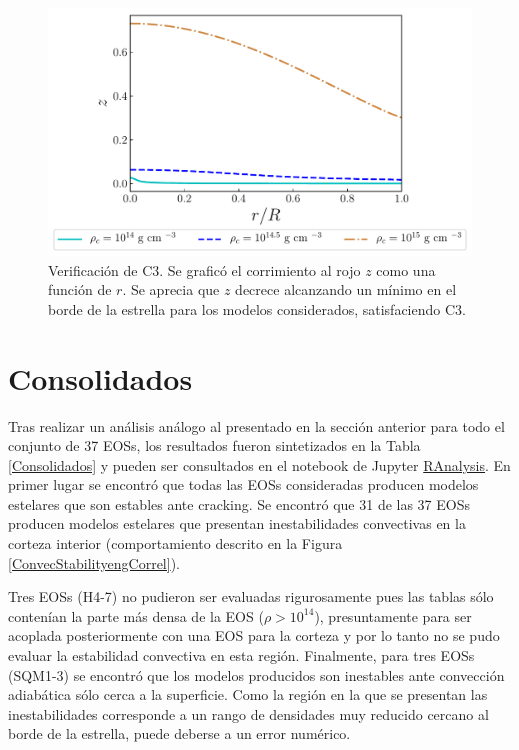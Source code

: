 \begin{figure}[H]
    \centering
    \includegraphics[width=0.93\linewidth]{figures/Redshifteng.pdf}
    \caption{Verificación de C3. Se graficó el corrimiento al rojo $z$ como una función de $r$. Se aprecia que $z$ decrece alcanzando un mínimo en el borde de la estrella para los modelos considerados, satisfaciendo C3.}
    \label{Redshifteng}
\end{figure}

\section{Consolidados}

Tras realizar un análisis análogo al presentado en la sección anterior para todo el conjunto de 37 EOSs, los resultados fueron sintetizados en la Tabla \ref{Consolidados} y pueden ser consultados en el notebook de Jupyter \href{https://nbviewer.jupyter.org/github/DavidRamosSal/stellar_structure/blob/master/RAnalysis.ipynb}{RAnalysis}. En primer lugar se encontró que todas las EOSs consideradas producen modelos estelares que son estables ante cracking. Se encontró que 31 de las 37 EOSs producen modelos estelares que presentan inestabilidades convectivas en la corteza interior (comportamiento descrito en la Figura \ref{ConvecStabilityengCorrel}).

Tres EOSs (H4-7) no pudieron ser evaluadas rigurosamente pues las tablas sólo contenían la parte más densa de la EOS ($\rho > 10^{14}$), presuntamente para ser acoplada posteriormente con una EOS para la corteza y por lo tanto no se pudo evaluar la estabilidad convectiva en esta región. Finalmente, para tres EOSs (SQM1-3) se encontró que los modelos producidos son inestables ante convección adiabática sólo cerca a la superficie. Como la región en la que se presentan las inestabilidades corresponde a un rango de densidades muy reducido cercano al borde  de la estrella, puede deberse a un error numérico.

